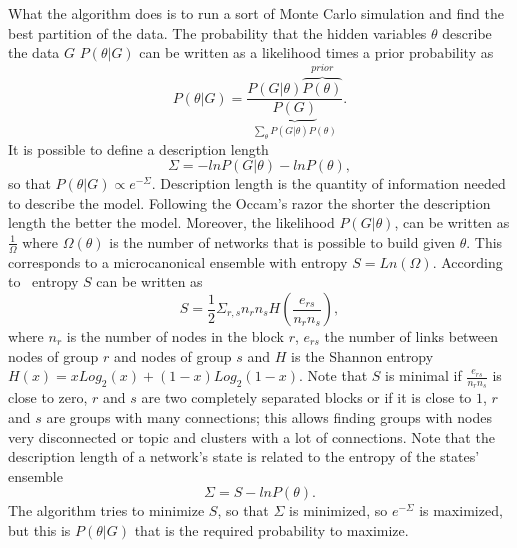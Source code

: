 What the algorithm does is to run a sort of Monte Carlo simulation and find the best partition of the data.
The probability that the hidden variables $\theta$ describe the data $G$ $P(\theta | G)$ can be written as a likelihood times a prior probability as
\[P(\theta|G)=\frac{P(G|\theta)\overbrace{P(\theta)}^{prior}}{\underbrace{P(G)}_{\sum_{\theta}P(G|\theta)P(\theta)}}.\]
It is possible to define a description length
\[
\Sigma=-lnP(G|\theta)-lnP(\theta),
\]
so that $P(\theta | G)\propto e^{-\Sigma}$. Description length is the quantity of information needed to describe the model. Following the Occam's razor the shorter the description length the better the model.
Moreover, the likelihood $P(G | \theta)$, can be written as $\frac{1}{\Omega}$ where $\Omega(\theta)$ is the number of networks that is possible to build given $\theta$. This corresponds to a microcanonical ensemble with entropy $S=Ln\left(\Omega\right)$. According to~\cite{peixoto2017nonparametric} entropy $S$ can be written as
\[
S=\frac{1}{2}\Sigma_{r,s} n_r n_s H\left(\frac{e_{rs}}{n_rn_s}\right),
\]
where $n_r$ is the number of nodes in the block $r$, $e_{rs}$ the number of links between nodes of group $r$ and nodes of group $s$ and $H$ is the Shannon entropy $H(x)=xLog_2(x)+(1-x)Log_2(1-x)$. Note that $S$ is minimal if $\frac{e_{rs}}{n_rn_s}$ is close to zero, $r$ and $s$ are two completely separated blocks or if it is close to $1$, $r$ and $s$ are groups with many connections; this allows finding groups with nodes very disconnected or topic and clusters with a lot of connections. Note that the description length of a network's state is related to the entropy of the states' ensemble
\[
\Sigma=S-lnP(\theta).
\]
The algorithm tries to minimize $S$, so that $\Sigma$ is minimized, so $e^{-\Sigma}$ is maximized, but this is $P(\theta | G)$ that is the required probability to maximize.

